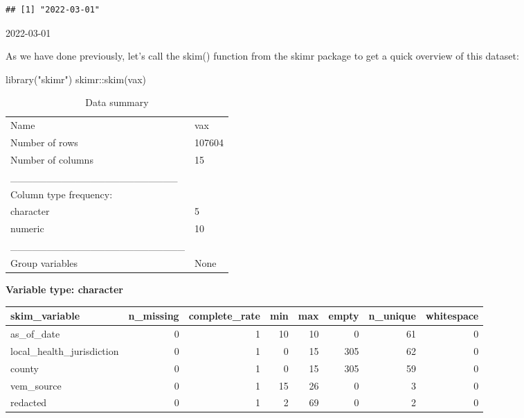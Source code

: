\documentclass[
]{article}
\newenvironment{Shaded}{\begin{snugshade}}{\end{snugshade}}
\newcommand{\FunctionTok}[1]{\textcolor[rgb]{0.00,0.00,0.00}{#1}}
\newcommand{\NormalTok}[1]{#1}
\newcommand{\SpecialCharTok}[1]{\textcolor[rgb]{0.00,0.00,0.00}{#1}}
\newcommand{\StringTok}[1]{\textcolor[rgb]{0.31,0.60,0.02}{#1}}
\begin{document}
\begin{Shaded}
\end{Shaded}

\begin{verbatim}
## [1] "2022-03-01"
\end{verbatim}

2022-03-01

As we have done previously, let's call the skim() function from the
skimr package to get a quick overview of this dataset:

\begin{Shaded}
\begin{Highlighting}[]
\FunctionTok{library}\NormalTok{(}\StringTok{"skimr"}\NormalTok{)}
\NormalTok{skimr}\SpecialCharTok{::}\FunctionTok{skim}\NormalTok{(vax)}
\end{Highlighting}
\end{Shaded}

\begin{longtable}[]{@{}ll@{}}
\caption{Data summary}\tabularnewline
\toprule
\endhead
Name & vax \\
Number of rows & 107604 \\
Number of columns & 15 \\
\_\_\_\_\_\_\_\_\_\_\_\_\_\_\_\_\_\_\_\_\_\_\_ & \\
Column type frequency: & \\
character & 5 \\
numeric & 10 \\
\_\_\_\_\_\_\_\_\_\_\_\_\_\_\_\_\_\_\_\_\_\_\_\_ & \\
Group variables & None \\
\bottomrule
\end{longtable}

\textbf{Variable type: character}

\begin{longtable}[]{@{}lrrrrrrr@{}}
\toprule
skim\_variable & n\_missing & complete\_rate & min & max & empty &
n\_unique & whitespace \\
\midrule
\endhead
as\_of\_date & 0 & 1 & 10 & 10 & 0 & 61 & 0 \\
local\_health\_jurisdiction & 0 & 1 & 0 & 15 & 305 & 62 & 0 \\
county & 0 & 1 & 0 & 15 & 305 & 59 & 0 \\
vem\_source & 0 & 1 & 15 & 26 & 0 & 3 & 0 \\
redacted & 0 & 1 & 2 & 69 & 0 & 2 & 0 \\
\bottomrule
\end{longtable}
\end{document}
